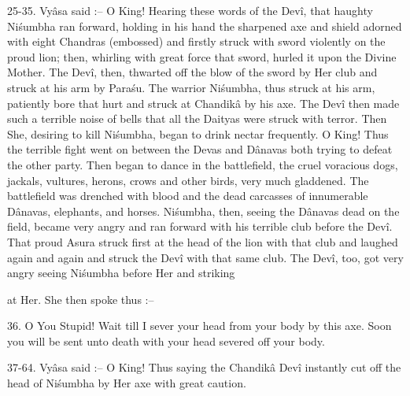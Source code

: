 25-35. Vy\^asa said :-- O King! Hearing these words of the Dev\^i, that haughty Ni\'sumbha ran forward, holding in his hand the sharpened axe and shield adorned with eight Chandras (embossed) and firstly struck with sword violently on the proud lion; then, whirling with great force that sword, hurled it upon the Divine Mother. The Dev\^i, then, thwarted off the blow of the sword by Her club and struck at his arm by Para\'su. The warrior Ni\'sumbha, thus struck at his arm, patiently bore that hurt and struck at Chandik\^a by his axe. The Dev\^i then made such a terrible noise of bells that all the Daityas were struck with terror. Then She, desiring to kill Ni\'sumbha, began to drink nectar frequently. O King! Thus the terrible fight went on between the Devas and D\^anavas both trying to defeat the other party. Then began to dance in the battlefield, the cruel voracious dogs, jackals, vultures, herons, crows and other birds, very much gladdened. The battlefield was drenched with blood and the dead carcasses of innumerable D\^anavas, elephants, and horses. Ni\'sumbha, then, seeing the D\^anavas dead on the field, became very angry and ran forward with his terrible club before the Dev\^i. That proud Asura struck first at the head of the lion with that club and laughed again and again and struck the Dev\^i with that same club. The Dev\^i, too, got very angry seeing Ni\'sumbha before Her and striking

at Her. She then spoke thus :--

36. O You Stupid! Wait till I sever your head from your body by this axe. Soon you will be sent unto death with your head severed off your body.

37-64. Vy\^asa said :-- O King! Thus saying the Chandik\^a Dev\^i instantly cut off the head of Ni\'sumbha by Her axe with great caution.


